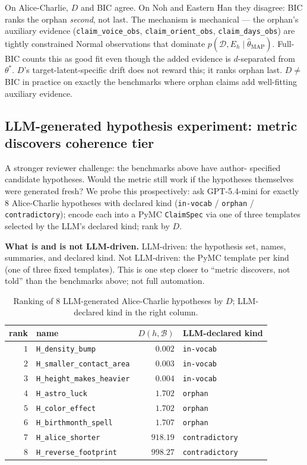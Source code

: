\documentclass{article}
\begin{document}
On Alice-Charlie, $D$ and BIC agree. On Noh and Eastern Han they
disagree: BIC ranks the orphan \emph{second}, not last. The
mechanism is mechanical --- the orphan's auxiliary evidence
(\texttt{claim\_voice\_obs}, \texttt{claim\_orient\_obs},
\texttt{claim\_days\_obs}) are tightly constrained Normal
observations that dominate $p(\mathcal{D}, E_{h} \mid
\hat{\theta}_{\mathrm{MAP}})$. Full-BIC counts this as good fit even
though the added evidence is $d$-separated from $\theta^{*}$. $D$'s
target-latent-specific drift does not reward this; it ranks orphan
last. $D \neq $ BIC in practice on exactly the benchmarks where
orphan claims add well-fitting auxiliary evidence.

\subsection{LLM-generated hypothesis experiment: metric discovers coherence tier}
\label{sec:llm-gen}

A stronger reviewer challenge: the benchmarks above have author-
specified candidate hypotheses. Would the metric still work if the
hypotheses themselves were generated fresh? We probe this
prospectively: ask GPT-5.4-mini for exactly $8$ Alice-Charlie
hypotheses with declared kind (\texttt{in-vocab} / \texttt{orphan} /
\texttt{contradictory}); encode each into a PyMC \texttt{ClaimSpec}
via one of three templates selected by the LLM's declared kind;
rank by $D$.

\textbf{What is and is not LLM-driven.} LLM-driven: the hypothesis
set, names, summaries, and declared kind. Not LLM-driven: the PyMC
template per kind (one of three fixed templates). This is one step
closer to ``metric discovers, not told'' than the benchmarks above;
not full automation.

\begin{table}[h]
\centering
\caption{Ranking of $8$ LLM-generated Alice-Charlie hypotheses by
$D$; LLM-declared kind in the right column.}
\label{tab:llm-gen}
\small
\begin{tabular}{rlrl}
\toprule
rank & name                               & $D(h, \mathcal{B})$ & LLM-declared kind \\
\midrule
$1$  & \texttt{H\_density\_bump}          & $0.002$   & \texttt{in-vocab} \\
$2$  & \texttt{H\_smaller\_contact\_area} & $0.003$   & \texttt{in-vocab} \\
$3$  & \texttt{H\_height\_makes\_heavier} & $0.004$   & \texttt{in-vocab} \\
$4$  & \texttt{H\_astro\_luck}            & $1.702$   & \texttt{orphan} \\
$5$  & \texttt{H\_color\_effect}          & $1.702$   & \texttt{orphan} \\
$6$  & \texttt{H\_birthmonth\_spell}      & $1.707$   & \texttt{orphan} \\
$7$  & \texttt{H\_alice\_shorter}         & $918.19$  & \texttt{contradictory} \\
$8$  & \texttt{H\_reverse\_footprint}     & $998.27$  & \texttt{contradictory} \\
\bottomrule
\end{tabular}
\end{table}
\end{document}
